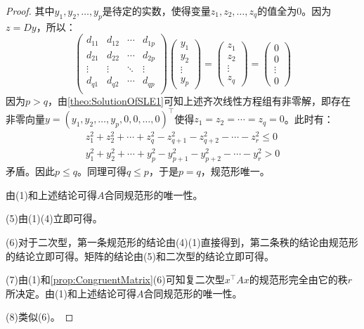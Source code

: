 \begin{proof}
	其中$y_1,y_2,\dots,y_p$是待定的实数，使得变量$z_1,z_2,\dots,z_q$的值全为$0$。因为$z=Dy$，所以：
	\begin{equation*}
		\begin{pmatrix}
			d_{11} & d_{12} & \cdots & d_{1p} \\
			d_{21} & d_{22} & \cdots & d_{2p} \\
			\vdots & \vdots & \ddots & \vdots \\
			d_{q1} & d_{q2} & \cdots & d_{qp} \\
		\end{pmatrix}
		\begin{pmatrix}
			y_1 \\
			y_2 \\
			\vdots \\
			y_p
		\end{pmatrix}
		=
		\begin{pmatrix}
			z_1 \\
			z_2 \\
			\vdots \\
			z_q
		\end{pmatrix}
		=
		\begin{pmatrix}
			0 \\
			0 \\
			\vdots \\
			0
		\end{pmatrix}
	\end{equation*}
	因为$p>q$，由\cref{theo:SolutionOfSLE1}可知上述齐次线性方程组有非零解，即存在非零向量$y=(y_1,y_2,\dots,y_p,0,0,\dots,0)^{\top}$使得$z_1=z_2=\cdots=z_q=0$。此时有：
	\begin{gather*}
		z_1^2+z_2^2+\cdots+z_q^2-z_{q+1}^2-z_{q+2}^2-\cdots-z_r^2\leqslant0 \\
		y_1^2+y_2^2+\cdots+y_p^2-y_{p+1}^2-y_{p+2}^2-\cdots-y_r^2>0
	\end{gather*}
	矛盾。因此$p\leqslant q$。同理可得$q\leqslant p$，于是$p=q$，规范形唯一。\par
	由(1)和上述结论可得$A$合同规范形的唯一性。\par
	(5)由(1)(4)立即可得。\par
	(6)对于二次型，第一条规范形的结论由(4)(1)直接得到，第二条秩的结论由规范形的结论立即可得。矩阵的结论由(5)和二次型的结论立即可得。\par
	(7)由(1)和\cref{prop:CongruentMatrix}(6)可知复二次型$x^{\top}Ax$的规范形完全由它的秩$r$所决定。由(1)和上述结论可得$A$合同规范形的唯一性。\par
	(8)类似(6)。
\end{proof}

